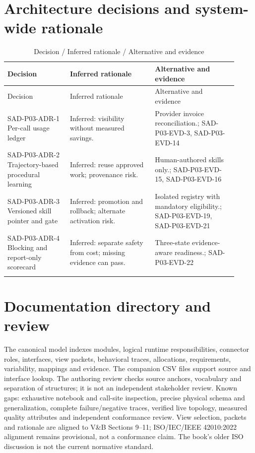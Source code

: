 \documentclass[10pt,letterpaper]{article}
\begin{document}
\section{Architecture decisions and system-wide rationale}
\begin{longtable}{@{}>{\raggedright\arraybackslash}p{0.25\linewidth}>{\raggedright\arraybackslash}p{0.34\linewidth}>{\raggedright\arraybackslash}p{0.33\linewidth}@{}}
\caption{Decision / Inferred rationale / Alternative and evidence}\\
\toprule Decision & Inferred rationale & Alternative and evidence\\\midrule\endfirsthead
\toprule Decision & Inferred rationale & Alternative and evidence\\\midrule\endhead
SAD-P03-ADR-1 Per-call usage ledger & Inferred: visibility without measured savings. & Provider invoice reconciliation.; SAD-P03-EVD-3, SAD-P03-EVD-14\\\addlinespace
SAD-P03-ADR-2 Trajectory-based procedural learning & Inferred: reuse approved work; provenance risk. & Human-authored skills only.; SAD-P03-EVD-15, SAD-P03-EVD-16\\\addlinespace
SAD-P03-ADR-3 Versioned skill pointer and gate & Inferred: promotion and rollback; alternate activation risk. & Isolated registry with mandatory eligibility.; SAD-P03-EVD-19, SAD-P03-EVD-21\\\addlinespace
SAD-P03-ADR-4 Blocking and report-only scorecard & Inferred: separate safety from cost; missing evidence can pass. & Three-state evidence-aware readiness.; SAD-P03-EVD-22\\\addlinespace
\bottomrule\end{longtable}

\section{Documentation directory and review}
The canonical model indexes modules, logical runtime responsibilities, connector roles, interfaces, view packets, behavioral traces, allocations, requirements, variability, mappings and evidence. The companion CSV files support source and interface lookup. The authoring review checks source anchors, vocabulary and separation of structures; it is not an independent stakeholder review. Known gaps: exhaustive notebook and call-site inspection, precise physical schema and generalization, complete failure/negative traces, verified live topology, measured quality attributes and independent conformance review. View selection, packets and rationale are aligned to V\&B Sections 9--11; ISO/IEC/IEEE 42010:2022 alignment remains provisional, not a conformance claim. The book's older ISO discussion is not the current normative standard.
\appendix
\end{document}
